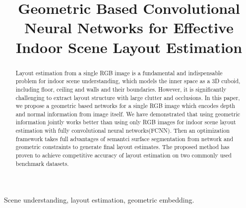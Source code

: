 \documentclass{article}
\title{Geometric Based Convolutional Neural Networks for Effective\\
	Indoor Scene Layout Estimation}
\begin{document}
%
\maketitle
%
\begin{abstract}
Layout estimation from a single RGB image is a fundamental and indispensable problem for indoor scene understanding, which models the inner space as a 3D cuboid, including floor, ceiling and walls and their boundaries. However, it is significantly challenging to extract layout structure with large clutter and occlusions.
In this paper, we propose a geometric based networks for a single RGB image which encodes depth and normal information from image itself. We have demonstrated that using geometric information jointly works better than using only RGB images for indoor scene layout estimation with fully convolutional neural networks(FCNN). Then an optimization framework takes full advantages of semantci surface segmentation from network and geometric constraints to generate final layout estimates. The proposed method has proven to achieve competitive accuracy of layout estimation on two commonly used benchmark datasets.
\end{abstract}
%
\begin{keywords}
Scene understanding, layout estimation, geometric embedding.
\end{keywords}
%





\end{document}
